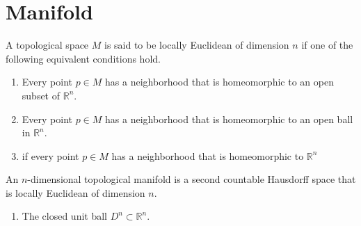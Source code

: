 \chapter{Manifold}

\begin{defbox}
    \begin{definition}
        A topological space \(M\) is said to be locally Euclidean of dimension \(n\) if one of the following equivalent conditions hold.
        \begin{enumerate}
            \item Every point \(p \in M\) has a neighborhood that is homeomorphic to an open subset of \(\mathbb{R}^n\).
            \item Every point \(p \in M\) has a neighborhood that is homeomorphic to an open ball in \(\mathbb{R}^n\).
            \item if every point \(p \in M\) has a neighborhood that is homeomorphic to \(\mathbb{R}^n\)
        \end{enumerate}
    \end{definition}
\end{defbox}

\begin{defbox}
    \begin{definition}
        An \(n\)-dimensional topological manifold is a second countable Hausdorff space that is locally Euclidean of dimension \(n\).
    \end{definition}
\end{defbox}

\begin{example}
    \begin{enumerate}
        \item The closed unit ball \(D^n \subset \mathbb{R}^n\).
    \end{enumerate}
\end{example}